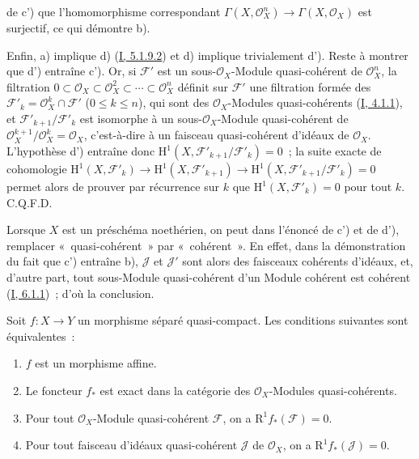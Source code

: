 
de c') que l'homomorphisme correspondant
$\Gamma(X,\mathcal{O}_X^n)\to\Gamma(X,\mathcal{O}_X)$ est surjectif, ce qui
démontre b).

Enfin, a) implique d) (\hyperref[I.5.1.9.2-fr]{I, 5.1.9.2}) et d) implique
trivialement d'). Reste à montrer que d') entraîne c'). Or, si
$\mathcal{F}'$ est un sous-$\mathcal{O}_X$-Module quasi-cohérent de
$\mathcal{O}_X^n$, la filtration
$0\subset\mathcal{O}_X\subset\mathcal{O}_X^2\subset\cdots\subset
\mathcal{O}_X^n$ définit sur $\mathcal{F}'$ une filtration formée des
$\mathcal{F}'_k=\mathcal{O}_X^k\cap\mathcal{F}'$ ($0\leq k\leq n$), qui
sont des $\mathcal{O}_X$-Modules quasi-cohérents
(\hyperref[I.4.1.1-fr]{I, 4.1.1}), et
$\mathcal{F}'_{k+1}/\mathcal{F}'_k$ est isomorphe à un
sous-$\mathcal{O}_X$-Module quasi-cohérent de
$\mathcal{O}_X^{k+1}/\mathcal{O}_X^k=\mathcal{O}_X$, c'est-à-dire à un
faisceau quasi-cohérent d'idéaux de $\mathcal{O}_X$. L'hypothèse d')
entraîne donc
$\mathrm{H}^1(X,\mathcal{F}'_{k+1}/\mathcal{F}'_k)=0$~; la suite exacte de
cohomologie
$\mathrm{H}^1(X,\mathcal{F}'_k)\to\mathrm{H}^1(X,\mathcal{F}'_{k+1})
\to\mathrm{H}^1(X,\mathcal{F}'_{k+1}/\mathcal{F}'_k)=0$ permet alors de
prouver par récurrence sur $k$ que
$\mathrm{H}^1(X,\mathcal{F}'_k)=0$ pour tout $k$. C.Q.F.D.

\begin{remark}[5.2.1.1]
\label{II.5.2.1.1-fr}
Lorsque $X$ est un préschéma noethérien, on peut dans l'énoncé de c') et de
d'), remplacer «~quasi-cohérent~» par «~cohérent~». En effet, dans la
démonstration du fait que c') entraîne b), $\mathcal{J}$ et $\mathcal{J}'$
sont alors des faisceaux cohérents d'idéaux, et, d'autre part, tout
sous-Module quasi-cohérent d'un Module cohérent est cohérent
(\hyperref[I.6.1.1-fr]{I, 6.1.1})~; d'où la conclusion.
\end{remark}

\begin{corollary}[5.2.2]
\label{II.5.2.2-fr}
Soit $f:X\to Y$ un morphisme séparé quasi-compact. Les conditions suivantes
sont équivalentes~:
\begin{enumerate}
  \item[\rm{a)}] $f$ est un morphisme affine.
  \item[\rm{b)}] Le foncteur $f_*$ est exact dans la catégorie des
  $\mathcal{O}_X$-Modules quasi-cohérents.
  \item[\rm{c)}] Pour tout $\mathcal{O}_X$-Module quasi-cohérent
  $\mathcal{F}$, on a $\mathrm{R}^1f_*(\mathcal{F})=0$.
  \item[\rm{c')}] Pour tout faisceau d'idéaux quasi-cohérent $\mathcal{J}$
  de $\mathcal{O}_X$, on a $\mathrm{R}^1f_*(\mathcal{J})=0$.
\end{enumerate}
\end{corollary}

